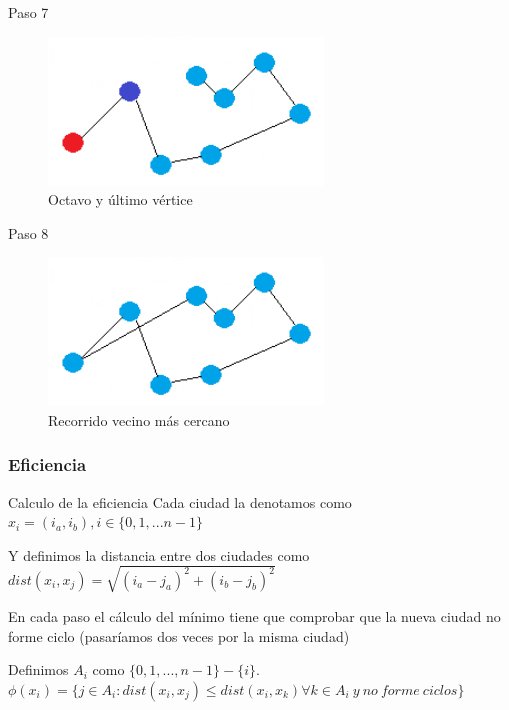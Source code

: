 \begin{frame}
	\begin{exampleblock}{Paso 7}
	\begin{figure}[htbH]
		\centering
		\includegraphics[width=0.65\textwidth]{./Imagenes/vecino7.png}
		\caption{Octavo y último vértice}
	\end{figure}
	\end{exampleblock}
\end{frame}

\begin{frame}
	\begin{exampleblock}{Paso 8}
	\begin{figure}[htbH]
		\centering
		\includegraphics[width=0.65\textwidth]{./Imagenes/vecino8.png}
		\caption{Recorrido vecino más cercano}
	\end{figure}
	\end{exampleblock}
\end{frame}


\subsubsection{Eficiencia}
\begin{frame}
	\begin{block}{Calculo de la eficiencia}
	Cada ciudad la denotamos como $x_i = (i_a,i_b), i \in \{ 0,1,...n-1 \} $
	
	Y definimos la distancia entre dos ciudades como
	$dist(x_i, x_j) = \sqrt{ (i_a-j_a)^2 + (i_b-j_b)^2 }$
	\end{block}
	
	\begin{block}{ }
	En cada paso el cálculo del mínimo tiene que comprobar que la nueva ciudad no forme
	ciclo (pasar\'iamos dos veces por la misma ciudad)
	
	Definimos 
	$A_i$ como $\{ 0,1,..., n-1\}-\{ i \}$.
	$\phi (x_i) = \{ j \in A_i : dist(x_i, x_j) \leq dist(x_i,x_k) \forall k \in A_i \ y \ no \ forme \ ciclos \}$
	\end{block}
\end{frame}

